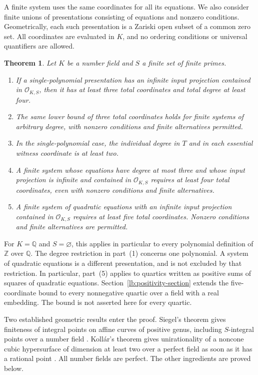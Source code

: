 \documentclass[11pt,a4paper]{article}
\newtheorem{theorem}{Theorem}[section]
\theoremstyle{definition}
\newcommand{\OKS}{\mathcal O_{K,S}}
\begin{document}
A finite system uses the same coordinates for all its equations.
We also consider finite unions of presentations consisting of equations
and nonzero conditions. Geometrically, each such presentation is a
Zariski open subset of a common zero set. All coordinates are evaluated
in $K$, and no ordering conditions or universal quantifiers are allowed.

\begin{samepage}
\begin{theorem}\label{lb:main}
Let $K$ be a number field and $S$ a finite set of finite primes.
\begin{enumerate}
\item If a single-polynomial presentation has an infinite input
projection contained in $\OKS$, then it has at least three total
coordinates and total degree at least four.
\item The same lower bound of three total coordinates holds for
finite systems of arbitrary degree, with nonzero conditions and finite
alternatives permitted.
\item In the single-polynomial case, the individual degree in $T$
and in each essential witness coordinate is at least two.
\item A finite system whose equations have degree at most three
and whose input projection is infinite and contained in $\OKS$
requires at least four total coordinates, even with nonzero
conditions and finite alternatives.
\item A finite system of quadratic equations with an infinite
input projection contained in $\OKS$ requires at least five total
coordinates. Nonzero conditions and finite alternatives are permitted.
\end{enumerate}
\end{theorem}
\end{samepage}

For $K=\mathbb Q$ and $S=\varnothing$, this applies in particular
to every polynomial definition of $\mathbb Z$ over $\mathbb Q$.
The degree restriction in part~(1) concerns one polynomial. A system
of quadratic equations is a different presentation, and is not
excluded by that restriction. In particular, part~(5) applies to
quartics written as positive sums of squares of quadratic equations.
Section~\ref{lb:positivity-section} extends the five-coordinate bound
to every nonnegative quartic over a field with a real embedding.
The bound is not asserted here for every quartic.

Two established geometric results enter the proof. Siegel's theorem
gives finiteness of integral points on affine curves of positive
genus, including $S$-integral points over a number field
\cite[Chapter~8]{Lang}. Koll\'ar's theorem gives unirationality of a
noncone cubic hypersurface of dimension at least two over a perfect
field as soon as it has a rational point \cite[Theorem~2]{Kollar}.
All number fields are perfect. The other ingredients are proved below.
\end{document}
